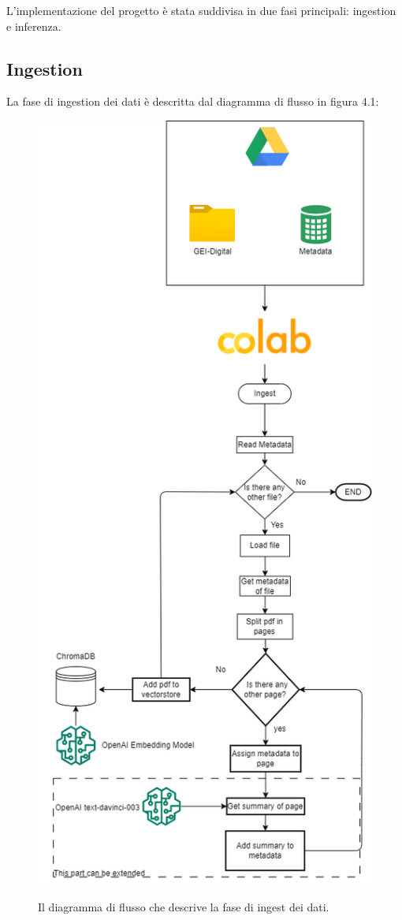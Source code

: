 L'implementazione del progetto è stata suddivisa in due fasi principali: ingestion e inferenza.

\subsection{Ingestion} 
La fase di ingestion dei dati è descritta dal diagramma di flusso in figura 4.1:
\begin{figure}[H]
    \centering
    \includegraphics[height=0.5\pdfpageheight]{images/ingest.png}\label{fig:ingest}
    \caption[Ingestion]{Il diagramma di flusso che descrive la fase di ingest dei dati.}
\end{figure}

